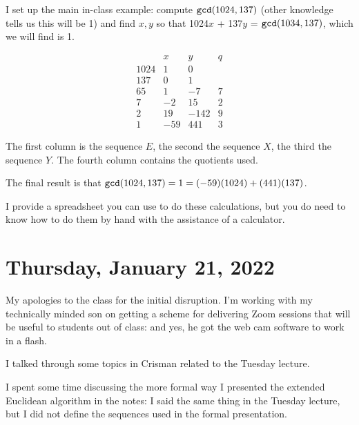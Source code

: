 \documentclass[12pt]{article}
\begin{document}
I set up the main in-class example:  compute ${\tt gcd}(1024,137)$ (other knowledge tells us this will be 1) and find $x,y$ so that
1024$x$ + 137$y$ = ${\tt gcd}(1034,137)$, which we will find is 1.

$$\begin{array}{c|c|c|c}

&x & y& q \\

1024 & 1&0 &\\

 137 & 0 & 1 &\\

 65 & 1 & -7 & 7\\

7 &-2 & 15& 2 \\

 2 &19 & -142& 9 \\

 1 &-59 & 441 & 3
\end{array}$$

The first column is the sequence $E$, the second the sequence $X$, the third the sequence $Y$.  The fourth column contains the quotients used.

The final result is that ${\tt gcd}(1024,137)= 1 = (-59)(1024)+(441)(137)$.

I provide a spreadsheet you can use to do these calculations, but you do need to know how to do them by hand with the assistance of a calculator.

\section{Thursday, January 21, 2022}

My apologies to the class for the initial disruption.  I'm working with my technically minded son on getting a scheme for delivering Zoom sessions that will be useful to students out of class:  and yes, he got the web cam software to work in a flash.

I talked through some topics in Crisman related to the Tuesday lecture.

I spent some time discussing the more formal way I presented the extended Euclidean algorithm in the notes:  I said the same thing in the Tuesday lecture, but I did not define the sequences used in the formal presentation.
\end{document}
